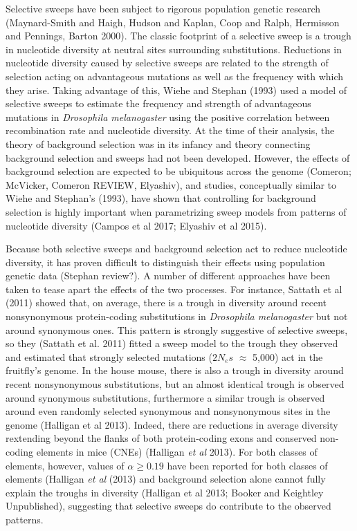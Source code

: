 \documentclass[11pt]{article}
\begin{document}
Selective sweeps have been subject to rigorous population genetic research (Maynard-Smith and Haigh, Hudson and Kaplan, Coop and Ralph, Hermisson and Pennings, Barton 2000). The classic footprint of a selective sweep is a trough in nucleotide diversity at neutral sites surrounding substitutions. Reductions in nucleotide diversity caused by selective sweeps are related to the strength of selection acting on advantageous mutations as well as the frequency with which they arise. Taking advantage of this, Wiehe and Stephan (1993) used a model of selective sweeps to estimate the frequency and strength of advantageous mutations in \textit{Drosophila melanogaster} using the positive correlation between recombination rate and nucleotide diversity. At the time of their analysis, the theory of background selection was in its infancy and theory connecting background selection and sweeps had not been developed. However, the effects of background selection are expected to be ubiquitous across the genome (Comeron; McVicker, Comeron REVIEW, Elyashiv), and studies, conceptually similar to Wiehe and Stephan's (1993), have shown that controlling for background selection is highly important when parametrizing sweep models from patterns of nucleotide diversity (Campos et al 2017; Elyashiv et al 2015).

Because both selective sweeps and background selection act to reduce nucleotide diversity, it has proven difficult to distinguish their effects using population genetic data (Stephan review?). A number of different approaches have been taken to tease apart the effects of the two processes. For instance, Sattath et al (2011) showed that, on average, there is a trough in diversity around recent nonsynonymous protein-coding substitutions in \textit{Drosophila melanogaster} but not around synonymous ones. This pattern is strongly suggestive of selective sweeps, so they (Sattath et al. 2011) fitted a sweep model to the trough they observed and estimated that strongly selected mutations ($2N_es$ $\approx$ 5,000) act in the fruitfly's genome.  In the house mouse, there is also a trough in diversity around recent nonsynonymous substitutions, but an almost identical trough is observed around synonymous substitutions, furthermore a similar trough is observed around even randomly selected synonymous and nonsynonymous sites in the genome (Halligan et al 2013). Indeed, there are reductions in average diversity rextending beyond the flanks of both protein-coding exons and conserved non-coding elements in mice (CNEs) (Halligan \textit{et al} 2013). For both classes of elements, however, values of $\alpha \geq 0.19$ have been reported for both classes of elements (Halligan \textit{et al} (2013) and background selection alone cannot fully explain the troughs in diversity (Halligan et al 2013; Booker and Keightley Unpublished), suggesting that selective sweeps do contribute to the observed patterns.
\end{document}
